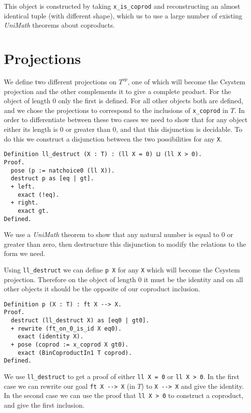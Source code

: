 This object is constructed by taking \lstinline|x_is_coprod| and reconstructing
an almost identical tuple (with different shape), which us to use a large number
of existing \textit{UniMath} theorems about coproducts.

\section{Projections}
We define two different projections on $T^{op}$, one of which will become the
Csystem projection and the other complements it to give a complete product. For
the object of length 0 only the first is defined. For all other objects both are
defined, and we chose the projections to correspond to the inclusions of
\lstinline|x_coprod| in $T$. In order to differentiate between these two cases
we need to show that for any object either its length is 0 or greater than 0,
and that this disjunction is decidable. To do this we construct a disjunction
between the two possibilities for any \lstinline|X|.

\begin{lstlisting}
Definition ll_destruct (X : T) : (ll X = 0) ⨿ (ll X > 0).
Proof.
  pose (p := natchoice0 (ll X)).
  destruct p as [eq | gt].
  + left.
    exact (!eq).
  + right.
    exact gt.
Defined.
\end{lstlisting}

We use a \textit{UniMath} theorem to show that any natural number is equal to 0
or greater than zero, then destructure this disjunction to modify the relations
to the form we need.

Using \lstinline|ll_destruct| we can define \lstinline|p X| for any
\lstinline|X| which will become the Csystem projection. Therefore on the object
of length 0 it must be the identity and on all other objects it should be the
opposite of our coproduct inclusion. 
\begin{lstlisting}
Definition p (X : T) : ft X --> X.
Proof.
  destruct (ll_destruct X) as [eq0 | gt0].
  + rewrite (ft_on_0_is_id X eq0).
    exact (identity X).
  + pose (coprod := x_coprod X gt0).
    exact (BinCoproductIn1 T coprod).
Defined.
\end{lstlisting}

We use \lstinline|ll_destruct| to get a proof of either \lstinline|ll X = 0| or
\lstinline|ll X > 0|. In the first case we can rewrite our goal 
\lstinline|ft X --> X| (in $T$) to \lstinline|X --> X| and give the identity. 
In the second case we can use the proof that \lstinline|ll X > 0| to construct 
a coproduct, and give the first inclusion.

